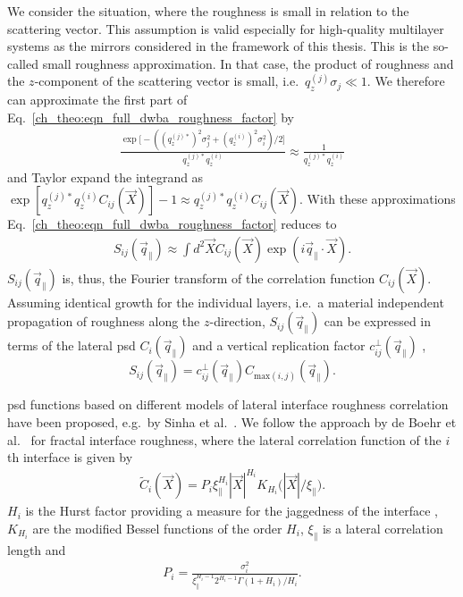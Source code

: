 We consider the situation, where the roughness is small in relation to the scattering vector. This assumption is valid especially for high-quality multilayer systems as the mirrors considered in the framework of this thesis. This is the so-called small roughness approximation. In that case, the product of roughness and the $z$-component of the scattering vector is small, i.e.~$q_z^{(j)} \sigma_j \ll 1$. We therefore can approximate the first part of Eq.~\eqref{ch_theo:eqn_full_dwba_roughness_factor} by
\begin{align}
\frac{\exp \Big[-((q_z^{(j)*})^2 \sigma_j^2 + (q_z^{(i)})^{2} \sigma_i^2)/2\Big]}{q_z^{(j)*} q_z^{(i)}} \approx \frac{1}{q_z^{(j)*} q_z^{(i)}}
\end{align}
and Taylor expand the integrand as $\exp [q_z^{(j)*} q_z^{(i)} C_{ij}(\vec{X})]-1 \approx q_z^{(j)*} q_z^{(i)} C_{ij}(\vec{X})$. With these approximations Eq.~\eqref{ch_theo:eqn_full_dwba_roughness_factor} reduces to
\begin{align}
S_{ij}(\vec{q}_\parallel) \approx \int d^2 \vec{X} C_{ij}(\vec{X}) \exp(i \vec{q}_\parallel \cdot \vec{X}) \text{.} \label{eqn:reduced_structure_factor}
\end{align}
$S_{ij}(\vec{q}_\parallel)$ is, thus, the Fourier transform of the correlation function $C_{ij}(\vec{X})$. Assuming identical growth for the individual layers, i.e.~a material independent propagation of roughness along the $z$-direction, $S_{ij}(\vec{q}_\parallel)$ can be expressed in terms of the lateral \gls{psd} $C_{i}(\vec{q}_\parallel)$ and a vertical replication factor $c_{ij}^{\perp}(\vec{q}_\parallel)$ \cite{spiller_multilayer_1993},
\begin{equation}
        S_{ij}(\vec{q}_\parallel) = c_{ij}^{\perp}(\vec{q}_\parallel) C_{\text{max}(i,j)}(\vec{q}_\parallel)\text{.} \label{eqn:factorized_structure_factor}
\end{equation}

\Gls{psd} functions based on different models of lateral interface roughness correlation have been proposed, e.g.~by Sinha et al.~\cite{sinha_x-ray_1988}. We follow the approach by de Boehr et al.~\cite{boer_influence_1994,de_boer_x-ray_1995} for fractal interface roughness, where the lateral correlation function of the $i$th interface is given by
\begin{align}
\tilde{C}_i(\vec{X}) = P_i \xi_\parallel^{H_i} |\vec{X}|^{H_i} K_{H_i}\Big(|\vec{X}|/\xi_\parallel\Big) \text{.} \label{eqn:lateral_correlation_function}
\end{align}
$H_i$ is the Hurst factor providing a measure for the jaggedness of the interface \cite{sinha_x-ray_1988}, $K_{H_i}$ are the modified Bessel functions of the order $H_i$, $\xi_\parallel$ is a lateral correlation length and
\begin{align}
P_i = \frac{\sigma_i^2}{\xi_\parallel^{H_i-1} 2^{H_i-1} \Gamma(1+H_i)/H_i}\text{.}
\end{align}

